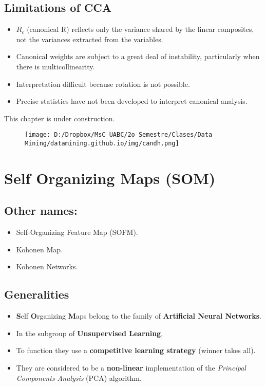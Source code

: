 \documentclass[]{book}
\providecommand{\tightlist}{%
  \setlength{\itemsep}{0pt}\setlength{\parskip}{0pt}}
\begin{document}
\section{Limitations of CCA}\label{limitations-of-cca}

\begin{itemize}
\tightlist
\item
  \(R_c\) (canonical R) reflects only the variance shared by the linear
  composites, not the variances extracted from the variables.
\item
  Canonical weights are subject to a great deal of instability,
  particularly when there is multicollinearity.
\item
  Interpretation difficult because rotation is not possible.
\item
  Precise statistics have not been developed to interpret canonical
  analysis.
\end{itemize}

This chapter is under construction.

\begin{figure}[htbp]
\centering
\texttt{[image: D:/Dropbox/MsC UABC/2o Semestre/Clases/Data Mining/datamining.github.io/img/candh.png]}
\caption{}
\end{figure}

\chapter{Self Organizing Maps (SOM)}\label{self-organizing-maps-som}

\section{Other names:}\label{other-names}

\begin{itemize}
\tightlist
\item
  Self-Organizing Feature Map (SOFM).
\item
  Kohonen Map.
\item
  Kohonen Networks.
\end{itemize}

\section{Generalities}\label{generalities}

\begin{itemize}
\tightlist
\item
  \textbf{S}elf \textbf{O}rganizing \textbf{M}aps belong to the family
  of \textbf{Artificial Neural Networks}.
\item
  In the subgroup of \textbf{Unsupervised Learning},
\item
  To function they use a \textbf{competitive learning strategy} (winner
  takes all).
\item
  They are considered to be a \textbf{non-linear} implementation of the
  \emph{Principal Components Analysis} (PCA) algorithm. 
\end{itemize}
\end{document}
